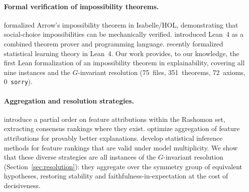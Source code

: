 \paragraph{Formal verification of impossibility theorems.}
\citet{nipkow2009social} formalized Arrow's impossibility theorem in
Isabelle/HOL, demonstrating that social-choice impossibilities can be
mechanically verified.  \citet{demoura2021lean4} introduced Lean~4 as a
combined theorem prover and programming language.
\citet{zhang2026statistical} recently formalized statistical learning theory in
Lean~4.  Our work provides, to our knowledge, the first Lean formalization of
an impossibility theorem in explainability, covering all nine instances and the
$G$-invariant resolution (75~files, 351~theorems, 72~axioms, 0~\texttt{sorry}).

\paragraph{Aggregation and resolution strategies.}
\citet{laberge2023partial} introduce a partial order on feature attributions
within the Rashomon set, extracting consensus rankings where they exist.
\citet{decker2024provably} optimize aggregation of feature attributions for
provably better explanations.
\citet{herren2023statistical} develop statistical inference methods for feature
rankings that are valid under model multiplicity.  We show that these diverse
strategies are all instances of the $G$-invariant resolution
(Section~\ref{sec:resolution}): they aggregate over the symmetry group of
equivalent hypotheses, restoring stability and faithfulness-in-expectation at
the cost of decisiveness.
